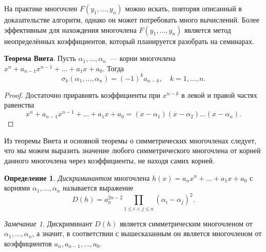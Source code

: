 \documentclass[a4paper,10pt]{amsart}
\theoremstyle{definition}
\newtheorem{definition}{Определение}
\theoremstyle{remark}
\newtheorem{remark}{Замечание}
\begin{document}
На практике многочлен $F(y_1, \ldots, y_n)$ можно искать, повторяя
описанный в доказательстве алгоритм, однако он может потребовать
много вычислений. Более эффективным для нахождения многочлена
$F(y_1, \ldots, y_n)$ является метод неопределённых коэффициентов,
который планируется разобрать на семинарах.

{\bf Теорема Виета}. Пусть $\alpha_1,\ldots,\alpha_n$~--- корни
многочлена $x^n + a_{n-1}x^{n-1} + \dots + a_1x + a_0$. Тогда
$$
\sigma_k(\alpha_1,\ldots,\alpha_n)=(-1)^k a_{n-k}, \quad k = 1,
\ldots, n.
$$

\begin{proof}
	Достаточно приравнять коэффициенты при $x^{n-k}$ в левой и правой
	частях равенства
	$$
	x^n+a_{n-1}x^{n-1}+\dots+a_1x+a_0=(x-\alpha_1)(x-\alpha_2)\ldots
	(x-\alpha_n).
	$$
\end{proof}

Из теоремы Виета и основной теоремы о симметрических многочленах
следует, что мы можем выразить значение любого симметрического
многочлена от корней данного многочлена через коэффициенты, не
находя самих корней.

\begin{definition}
	{\it Дискриминантом} многочлена $h(x)=a_nx^n+\ldots+a_1x+a_0$ с
	корнями $\alpha_1, \ldots, \alpha_n$ называется выражение
	$$
	D(h) = a_n^{2n-2} \prod \limits_{1 \leqslant i < j \leqslant n}
	(\alpha_i - \alpha_j)^2.
	$$
\end{definition}

\begin{remark}
	Дискриминант $D(h)$ является симметрическим многочленом от
	$\alpha_1, \ldots, \alpha_n$, а значит, в соответствии с
	вышесказанным он является многочленом от коэффициентов $a_n,
	a_{n-1}, \ldots, a_0$.
\end{remark}
\end{document}

